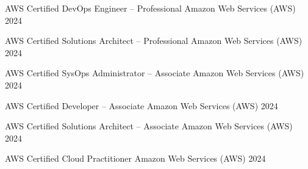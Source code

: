 

\begin{cvhonors}

  \cvhonor
  {AWS Certified DevOps Engineer – Professional} %
  {Amazon Web Services (AWS)} %
  {} %
  {2024} %

  \cvhonor
  {AWS Certified Solutions Architect – Professional} %
  {Amazon Web Services (AWS)} %
  {} %
  {2024} %

  \cvhonor
  {AWS Certified SysOps Administrator – Associate} %
  {Amazon Web Services (AWS)} %
  {} %
  {2024} %

  \cvhonor
  {AWS Certified Developer – Associate} %
  {Amazon Web Services (AWS)} %
  {} %
  {2024} %

  \cvhonor
  {AWS Certified Solutions Architect – Associate} %
  {Amazon Web Services (AWS)} %
  {} %
  {2024} %

  \cvhonor
  {AWS Certified Cloud Practitioner} %
  {Amazon Web Services (AWS)} %
  {} %
  {2024} %

\end{cvhonors}

